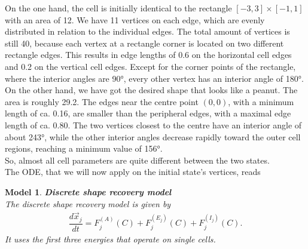 \documentclass[a4paper,12pt,leqno]{article}
\theoremstyle{plain}
\newtheorem{model}[theorem]{Model}
\theoremstyle{remark}
\begin{document}
On the one hand, the cell is initially identical to the rectangle $[-3,3]\times[-1,1]$ with an area of 12. We have 11 vertices on each edge, which are evenly distributed in relation to the individual edges. The total amount of vertices is still 40, because each vertex at a rectangle corner is located on two different rectangle edges. This results in edge lengths of 0.6 on the horizontal cell edges and 0.2 on the vertical cell edges. 
Except for the corner points of the rectangle, where the interior angles are 90°, every other vertex has an interior angle of 180°. \\
On the other hand, we have got the desired shape that looks like a peanut. The  area is roughly 29.2. The edges near the centre point $(0,0)$, with a minimum length of ca. 0.16, are smaller  than the peripheral edges, with a maximal edge length of ca. 0.80. The two vertices closest to the centre have an interior angle of about 243°, while the other interior angles decrease rapidly toward the outer cell regions, reaching a minimum value of 156°. \\
So, almost all cell parameters are quite different between the two states. \\
The ODE, that we will now apply on the initial state's vertices, reads
\begin{model} \textbf{Discrete shape recovery model} \\
	The discrete shape recovery model is given by
	\begin{align}
		\dfrac{d \vec{x}_j}{d t} = F^{(A)}_j(C) + F^{(E_j)}_j(C) +F^{(I_j)}_j(C) \label{eq:shapeRecovery}. 
	\end{align}
	It uses the first three energies that operate on single cells. 
\end{model}
\end{document}
